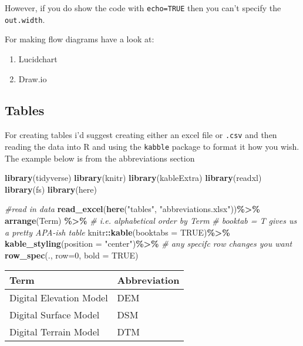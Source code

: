 \documentclass[
  12pt,
  oneside]{book}
\newenvironment{Shaded}{\begin{snugshade}}{\end{snugshade}}
\newcommand{\AttributeTok}[1]{\textcolor[rgb]{0.13,0.29,0.53}{#1}}
\newcommand{\CommentTok}[1]{\textcolor[rgb]{0.56,0.35,0.01}{\textit{#1}}}
\newcommand{\ConstantTok}[1]{\textcolor[rgb]{0.56,0.35,0.01}{#1}}
\newcommand{\DecValTok}[1]{\textcolor[rgb]{0.00,0.00,0.81}{#1}}
\newcommand{\FunctionTok}[1]{\textcolor[rgb]{0.13,0.29,0.53}{\textbf{#1}}}
\newcommand{\NormalTok}[1]{#1}
\newcommand{\SpecialCharTok}[1]{\textcolor[rgb]{0.81,0.36,0.00}{\textbf{#1}}}
\newcommand{\StringTok}[1]{\textcolor[rgb]{0.31,0.60,0.02}{#1}}
\providecommand{\tightlist}{%
  \setlength{\itemsep}{0pt}\setlength{\parskip}{0pt}}
\begin{document}
However, if you do show the code with \texttt{echo=TRUE} then you can't specify the \texttt{out.width}.

For making flow diagrams have a look at:

\begin{enumerate}
\def\labelenumi{\arabic{enumi}.}
\tightlist
\item
  Lucidchart
\item
  Draw.io
\end{enumerate}

\subsection{Tables}\label{tables}

For creating tables i'd suggest creating either an excel file or \texttt{.csv} and then reading the data into R and using the \texttt{kabble} package to format it how you wish. The example below is from the abbreviations section

\begin{Shaded}
\begin{Highlighting}[]
\FunctionTok{library}\NormalTok{(tidyverse)}
\FunctionTok{library}\NormalTok{(knitr)}
\FunctionTok{library}\NormalTok{(kableExtra)}
\FunctionTok{library}\NormalTok{(readxl)}
\FunctionTok{library}\NormalTok{(fs)}
\FunctionTok{library}\NormalTok{(here)}

\CommentTok{\#read in data}
\FunctionTok{read\_excel}\NormalTok{(}\FunctionTok{here}\NormalTok{(}\StringTok{"tables"}\NormalTok{, }\StringTok{"abbreviations.xlsx"}\NormalTok{))}\SpecialCharTok{\%\textgreater{}\%}
  \FunctionTok{arrange}\NormalTok{(Term) }\SpecialCharTok{\%\textgreater{}\%} \CommentTok{\# i.e. alphabetical order by Term}
  \CommentTok{\# booktab = T gives us a pretty APA{-}ish table}
\NormalTok{  knitr}\SpecialCharTok{::}\FunctionTok{kable}\NormalTok{(}\AttributeTok{booktabs =} \ConstantTok{TRUE}\NormalTok{)}\SpecialCharTok{\%\textgreater{}\%} 
  \FunctionTok{kable\_styling}\NormalTok{(}\AttributeTok{position =} \StringTok{"center"}\NormalTok{)}\SpecialCharTok{\%\textgreater{}\%}
  \CommentTok{\# any specifc row changes you want}
    \FunctionTok{row\_spec}\NormalTok{(.,}
  \AttributeTok{row=}\DecValTok{0}\NormalTok{,}
  \AttributeTok{bold =} \ConstantTok{TRUE}\NormalTok{)}
\end{Highlighting}
\end{Shaded}

\begin{table}
\centering
\begin{tabular}{ll}
\toprule
\textbf{Term} & \textbf{Abbreviation}\\
\midrule
Digital Elevation Model & DEM\\
Digital Surface Model & DSM\\
Digital Terrain Model & DTM\\
\bottomrule
\end{tabular}
\end{table}
\end{document}

